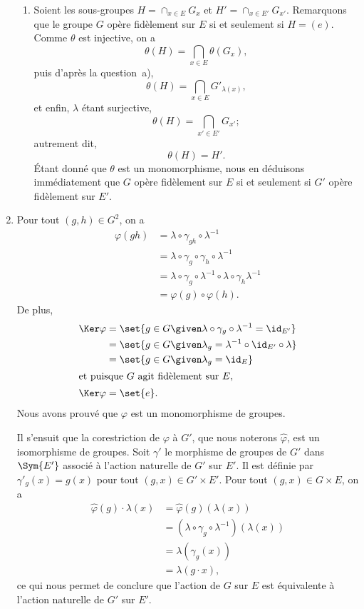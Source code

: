 \begin{enumerate}[label=\arabic*\up{o}]
\begin{enumerate}
      \item %
        Soient les sous-groupes $H = \cap_{x\in E} G_x$ et $H' = \cap_{x\in E'} G_{x'}$.
        Remarquons que le groupe $G$ opère fidèlement sur $E$ si et seulement si $H = (e)$.
        Comme $\theta$ est injective, on a
        \[
          \theta(H) = \bigcap_{x\in E} \theta(G_x),
        \]
        puis d'après la question~\primo a),
        \[
          \theta(H) = \bigcap_{x\in E} G'_{\lambda(x)},
        \]
        et enfin, $\lambda$ étant surjective,
        \[
          \theta(H) = \bigcap_{x'\in E'} G_{x'} ;
        \]
        autrement dit,
        \[
          \theta(H) = H'.
        \]
        Étant donné que $\theta$ est un monomorphisme, nous en déduisons immédiatement que $G$ opère fidèlement sur $E$ si et seulement si $G'$ opère fidèlement sur $E'$.
    \end{enumerate}
  \item %
    Pour tout $(g, h)\in G^2$, on a
    \begin{align*}
      \varphi(gh)
        &= \lambda\circ\gamma_{gh}\circ\lambda^{-1} \\
        &= \lambda\circ\gamma_g\circ\gamma_h\circ\lambda^{-1} \\
        &= \lambda\circ\gamma_g\circ\lambda^{-1}\circ\lambda\circ\gamma_h\lambda^{-1} \\
        &= \varphi(g)\circ\varphi(h).
    \end{align*}
    De plus,
    \begin{align*}
      \Ker\varphi
        &= \set{g\in G\given \lambda\circ\gamma_g\circ\lambda^{-1} = \id_{E'}} \\
        &= \set{g\in G\given \lambda_g = \lambda^{-1}\circ\id_{E'}\circ\lambda} \\
        &= \set{g\in G\given \lambda_g = \id_E} \\
        \shortintertext{et puisque $G$ agit fidèlement sur $E$,}
        \Ker\varphi &= \set{e}.
    \end{align*}
    Nous avons prouvé que $\varphi$ est un monomorphisme de groupes.

    Il s'ensuit que la corestriction de $\varphi$ à $G'$, que nous noterons $\hat{\varphi}$, est un isomorphisme de groupes.
    Soit $\gamma'$ le morphisme de groupes de $G'$ dans $\Sym{E'}$ associé à l'action naturelle de $G'$ sur $E'$.
    Il est définie par $\gamma'_{g}(x) = g(x)$ pour tout $(g, x)\in G'\times E'$.
    Pour tout $(g, x)\in G\times E$, on a
    \begin{align*}
      \hat{\varphi}(g)\cdot\lambda(x)
        &= \hat{\varphi}(g)(\lambda(x)) \\
        &= (\lambda\circ\gamma_g\circ\lambda^{-1})(\lambda(x)) \\
        &= \lambda(\gamma_g(x)) \\
        &= \lambda(g\cdot x),
    \end{align*}
    ce qui nous permet de conclure que l'action de $G$ sur $E$ est équivalente à l'action naturelle de $G'$ sur $E'$.

\end{enumerate}
